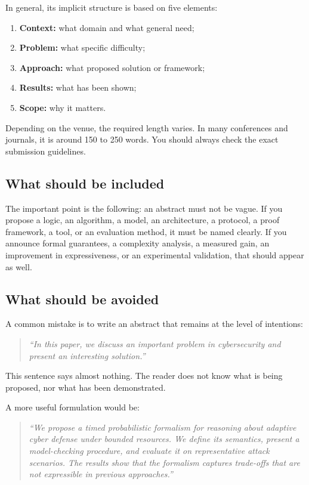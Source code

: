 \documentclass[11pt,a4paper]{article}
\theoremstyle{definition}
\begin{document}
In general, its implicit structure is based on five elements:
\begin{enumerate}[label=\arabic*.]
    \item \textbf{Context:} what domain and what general need;
    \item \textbf{Problem:} what specific difficulty;
    \item \textbf{Approach:} what proposed solution or framework;
    \item \textbf{Results:} what has been shown;
    \item \textbf{Scope:} why it matters.
\end{enumerate}
Depending on the venue, the required length varies. In many conferences and journals, it is around 150 to 250 words. You should always check the exact submission guidelines.

\subsection*{What should be included}

The important point is the following: an abstract must not be vague. If you propose a logic, an algorithm, a model, an architecture, a protocol, a proof framework, a tool, or an evaluation method, it must be named clearly. If you announce formal guarantees, a complexity analysis, a measured gain, an improvement in expressiveness, or an experimental validation, that should appear as well.

\subsection*{What should be avoided}

A common mistake is to write an abstract that remains at the level of intentions:
\begin{quote}
\textit{``In this paper, we discuss an important problem in cybersecurity and present an interesting solution.''}
\end{quote}
This sentence says almost nothing. The reader does not know what is being proposed, nor what has been demonstrated.

A more useful formulation would be:
\begin{quote}
\textit{``We propose a timed probabilistic formalism for reasoning about adaptive cyber defense under bounded resources. We define its semantics, present a model-checking procedure, and evaluate it on representative attack scenarios. The results show that the formalism captures trade-offs that are not expressible in previous approaches.''}
\end{quote}
\end{document}

